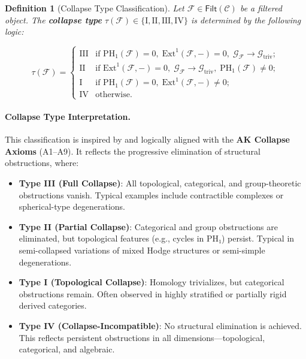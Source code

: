 \documentclass[11pt]{article}
\newtheorem{definition}[theorem]{Definition}
\begin{document}
\begin{definition}[Collapse Type Classification]
Let \( \mathcal{F} \in \mathsf{Filt}(\mathcal{C}) \) be a filtered object. The \textbf{collapse type} \( \tau(\mathcal{F}) \in \{ \mathrm{I}, \mathrm{II}, \mathrm{III}, \mathrm{IV} \} \) is determined by the following logic:

\[
\tau(\mathcal{F}) =
\begin{cases}
\mathrm{III} & \text{if } \mathrm{PH}_1(\mathcal{F}) = 0,\; \mathrm{Ext}^1(\mathcal{F}, -) = 0,\; \mathcal{G}_{\mathcal{F}} \longrightarrow \mathcal{G}_{\mathrm{triv}}; \\
\mathrm{II}  & \text{if } \mathrm{Ext}^1(\mathcal{F}, -) = 0,\; \mathcal{G}_{\mathcal{F}} \longrightarrow \mathcal{G}_{\mathrm{triv}},\; \mathrm{PH}_1(\mathcal{F}) \neq 0; \\
\mathrm{I}   & \text{if } \mathrm{PH}_1(\mathcal{F}) = 0,\; \mathrm{Ext}^1(\mathcal{F}, -) \neq 0; \\
\mathrm{IV}  & \text{otherwise}.
\end{cases}
\]
\end{definition}

\paragraph{Collapse Type Interpretation.}
This classification is inspired by and logically aligned with the \textbf{AK Collapse Axioms} (A1–A9). It reflects the progressive elimination of structural obstructions, where:

\begin{itemize}
    \item \textbf{Type III (Full Collapse)}: All topological, categorical, and group-theoretic obstructions vanish. Typical examples include contractible complexes or spherical-type degenerations.
    \item \textbf{Type II (Partial Collapse)}: Categorical and group obstructions are eliminated, but topological features (e.g., cycles in PH₁) persist. Typical in semi-collapsed variations of mixed Hodge structures or semi-simple degenerations.
    \item \textbf{Type I (Topological Collapse)}: Homology trivializes, but categorical obstructions remain. Often observed in highly stratified or partially rigid derived categories.
    \item \textbf{Type IV (Collapse-Incompatible)}: No structural elimination is achieved. This reflects persistent obstructions in all dimensions—topological, categorical, and algebraic.
\end{itemize}
\end{document}
